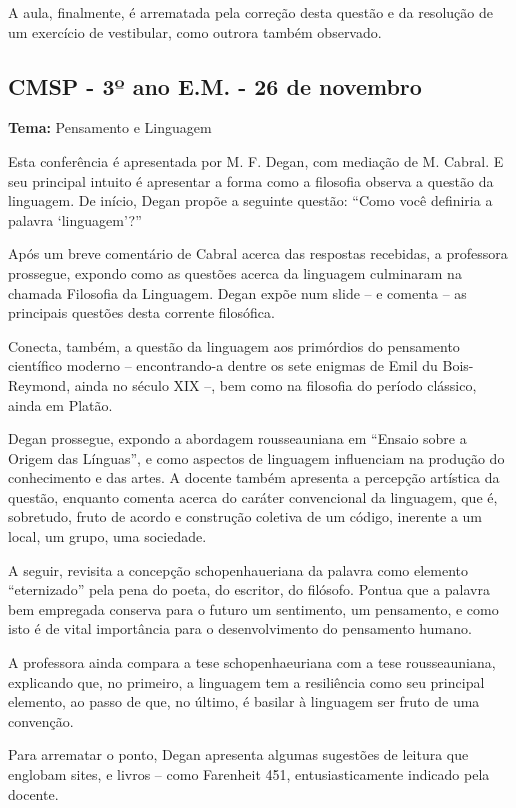 \documentclass[12pt,a4paper]{article}
\begin{document}
	A aula, finalmente, é arrematada pela correção desta questão 
	e da resolução de um exercício de vestibular, como outrora 
	também observado. 

	\subsection{CMSP - 3º ano E.M. - 26 de novembro}

	\textbf{Tema:} Pensamento e Linguagem

	Esta conferência é apresentada por M. F. Degan, com mediação 
	de M. Cabral. E seu principal intuito é apresentar a forma 
	como a filosofia observa a questão da linguagem. De início, 
	Degan propõe a seguinte questão: “Como você definiria a palavra 
	`linguagem'?” 

	Após um breve comentário de Cabral acerca das respostas recebidas, 
	a professora prossegue, expondo como as questões acerca da 
	linguagem culminaram na chamada Filosofia da Linguagem. Degan 
	expõe num slide -- e comenta -- as principais questões desta 
	corrente filosófica. 

	Conecta, também, a questão da linguagem aos primórdios do pensamento 
	científico moderno -- encontrando-a dentre os sete enigmas de Emil 
	du Bois-Reymond, ainda no século XIX --, bem como na filosofia 
	do período clássico, ainda em Platão. 

	Degan prossegue, expondo a abordagem rousseauniana em “Ensaio sobre a 
	Origem das Línguas”, e como aspectos de linguagem influenciam na 
	produção do conhecimento e das artes. A docente também apresenta 
	a percepção artística da questão, enquanto comenta acerca do caráter 
	convencional da linguagem, que é, sobretudo, fruto de acordo e 
	construção coletiva de um código, inerente a um local, um grupo, 
	uma sociedade. 

	A seguir, revisita a concepção schopenhaueriana da palavra como 
	elemento “eternizado” pela pena do poeta, do escritor, do filósofo. 
	Pontua que a palavra bem empregada conserva para o futuro um 
	sentimento, um pensamento, e como isto é de vital importância 
	para o desenvolvimento do pensamento humano. 

	A professora ainda compara a tese schopenhaeuriana com a tese 
	rousseauniana, explicando que, no primeiro, a linguagem tem 
	a resiliência como seu principal elemento, ao passo de que, no 
	último, é basilar à linguagem ser fruto de uma convenção. 

	Para arrematar o ponto, Degan apresenta algumas sugestões de leitura 
	que englobam sites, e livros -- como Farenheit 451, entusiasticamente 
	indicado pela docente. 
\end{document}
